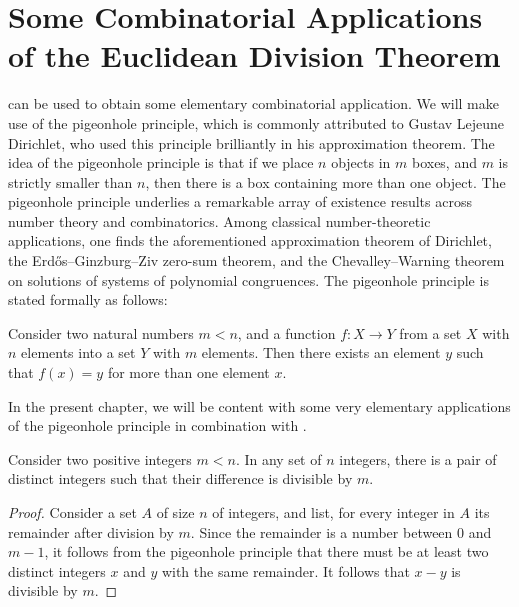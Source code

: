 \section[Combinatorial Applications]{Some Combinatorial Applications of the Euclidean Division Theorem}

 can be used to obtain some elementary combinatorial application. We will make use of the pigeonhole principle, which is commonly attributed to Gustav Lejeune Dirichlet, who used this principle brilliantly in his approximation theorem. The idea of the pigeonhole principle is that  if we place $n$ objects in $m$ boxes, and $m$ is strictly smaller than $n$, then there is a box containing more than one object. The pigeonhole principle underlies a remarkable array of existence results across number theory and combinatorics. Among classical number-theoretic applications, one finds the aforementioned approximation theorem of Dirichlet, the Erd\H{o}s--Ginzburg--Ziv zero-sum theorem, and the Chevalley--Warning theorem on solutions of systems of polynomial congruences. The pigeonhole principle is stated formally as follows:

\begin{theorem}
  Consider two natural numbers $m<n$, and a function $f:X\to Y$ from a set $X$ with $n$ elements into a set $Y$ with $m$ elements. Then there exists an element $y$ such that $f(x)=y$ for more than one element $x$.
\end{theorem}

In the present chapter, we will be content with some very elementary applications of the pigeonhole principle in combination with .

\begin{theorem}\label{theorem:existence-difference-divisible}
  Consider two positive integers $m<n$. In any set of $n$ integers, there is a pair of distinct integers such that their difference is divisible by $m$.
\end{theorem}

\begin{proof}
  Consider a set $A$ of size $n$ of integers, and list, for every integer in $A$ its remainder after division by $m$. Since the remainder is a number between $0$ and $m-1$, it follows from the pigeonhole principle that there must be at least two distinct integers $x$ and $y$ with the same remainder. It follows that $x-y$ is divisible by $m$.
\end{proof}

